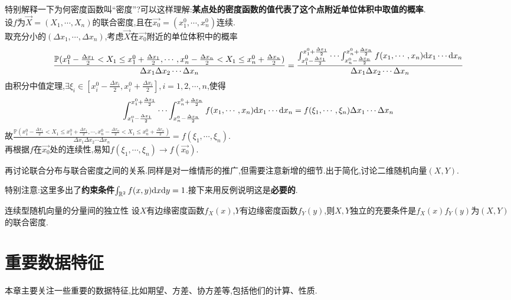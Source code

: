\documentclass[lang=cn,10pt]{elegantbook}
\begin{document}
特别解释一下为何密度函数叫“密度”?可以这样理解:\textbf{某点处的密度函数的值代表了这个点附近单位体积中取值的概率}.\\
设$f$为$\overrightarrow{X}=(X_1,\cdots,X_n)$的联合密度,且在$\overrightarrow{x_0}=(x_1^0,\cdots,x_n^0)$连续.\\
取充分小的$(\Delta x_1,\cdots,\Delta x_n)$,考虑$\overrightarrow{X}$在$\overrightarrow{x_0}$附近的单位体积中的概率
$$\frac{\mathbb{P}(x^0_1-\frac{\Delta x_1}{2}<X_1\leq x^0_1+\frac{\Delta x_1}{2},\cdots,x^0_n-\frac{\Delta x_n}{2}<X_1\leq x^0_n+\frac{\Delta x_n}{2})}{\Delta x_1\Delta x_2\cdots\Delta x_n}
=\frac{\int_{x_1^0-\frac{\Delta x_1}{2}}^{x_1^0+\frac{\Delta x_1}{2}}\cdots\int_{x_n^0-\frac{\Delta x_n}{2}}^{x_n^0+\frac{\Delta x_n}{2}}f(x_1,\cdots,x_n){\rm d}x_1\cdots{\rm d}x_n}{\Delta x_1\Delta x_2\cdots\Delta x_n}$$
由积分中值定理,$\exists \xi_i\in \left[x_i^0-\frac{\Delta x_i}{2},x_i^0+\frac{\Delta x_i}{2}\right],i=1,2,\cdots,n$,使得
$$\int_{x_1^0-\frac{\Delta x_1}{2}}^{x_1^0+\frac{\Delta x_1}{2}}\cdots\int_{x_n^0-\frac{\Delta x_n}{2}}^{x_n^0+\frac{\Delta x_n}{2}}f(x_1,\cdots,x_n){\rm d}x_1\cdots{\rm d}x_n=f(\xi_1,\cdots,\xi_n)\Delta x_1\cdots\Delta x_n$$
故$\frac{\mathbb{P}(x^0_1-\frac{\Delta x_1}{2}<X_1\leq x^0_1+\frac{\Delta x_1}{2},\cdots,x^0_n-\frac{\Delta x_n}{2}<X_1\leq x^0_n+\frac{\Delta x_n}{2})}{\Delta x_1\Delta x_2\cdots\Delta x_n}=f(\xi_1,\cdots,\xi_n)$.
\\再根据$f$在$\overrightarrow{x_0}$处的连续性,易知$f(\xi_1,\cdots,\xi_n)\to f(\overrightarrow{x_0})$.

再讨论联合分布与联合密度之间的关系.同样是对一维情形的推广,但需要注意新增的细节.出于简化,讨论二维随机向量$(X,Y)$.

特别注意:这里多出了\textbf{约束条件}$\int_{\mathbb{R}^2}f(x,y){\rm d}x{\rm d}y=1$.接下来用反例说明这是\textbf{必要的}.

\begin{example}
\end{example}

\begin{theorem}{连续型随机向量的分量间的独立性}{}
    设$X$有边缘密度函数$f_X(x)$,$Y$有边缘密度函数$f_Y(y)$,则$X,Y$独立的充要条件是$f_X(x)f_Y(y)$为$(X,Y)$的联合密度.
\end{theorem}


\chapter{重要数据特征}
本章主要关注一些重要的数据特征,比如期望、方差、协方差等,包括他们的计算、性质.
\end{document}
